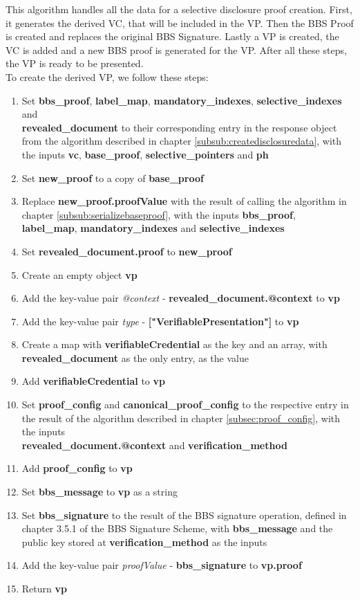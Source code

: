 \documentclass[
	a4paper               %
	,BCOR=0mm            %
	,bibliography=totoc   %
	,listof=totoc         %
	,monolingual
	,twoside=false
]{bfhthesis}              %
\begin{document}
This algorithm handles all the data for a selective disclosure proof creation.
First, it generates the derived VC, that will be included in the VP.
Then the BBS Proof is created and replaces the original BBS Signature.
Lastly a VP is created, the VC is added and a new BBS proof is generated for the VP.
After all these steps, the VP is ready to be presented.\\

To create the derived VP, we follow these steps:
\begin{enumerate}
	\item Set \textbf{bbs\_proof}, \textbf{label\_map}, \textbf{mandatory\_indexes}, \textbf{selective\_indexes} and \\\textbf{revealed\_document} to their corresponding entry in the response object from the algorithm described in chapter \ref{subsub:createdisclosuredata}, with the inputs \textbf{vc}, \textbf{base\_proof}, \textbf{selective\_pointers} and \textbf{ph}
	\item Set \textbf{new\_proof} to a copy of \textbf{base\_proof}
	\item Replace \textbf{new\_proof.proofValue} with the result of calling the algorithm in chapter \ref{subsub:serializebaseproof}, with the inputs \textbf{bbs\_proof}, \textbf{label\_map}, \textbf{mandatory\_indexes} and \textbf{selective\_indexes}
	\item Set \textbf{revealed\_document.proof} to \textbf{new\_proof}
	\item Create an empty object \textbf{vp}
	\item Add the key-value pair \textit{@context} - \textbf{revealed\_document.@context} to \textbf{vp}
	\item Add the key-value pair \textit{type} - \textbf{["VerifiablePresentation"]} to \textbf{vp}
	\item Create a map with \textbf{verifiableCredential} as the key and an array, with \\\textbf{revealed\_document} as the only entry, as the value
	\item Add \textbf{verifiableCredential} to \textbf{vp}
	\item Set \textbf{proof\_config} and \textbf{canonical\_proof\_config} to the respective entry in the result of the algorithm described in chapter \ref{subsec:proof_config}, with the inputs \\\textbf{revealed\_document.@context} and \textbf{verification\_method}
	\item Add \textbf{proof\_config} to \textbf{vp}
	\item Set \textbf{bbs\_message} to \textbf{vp} as a string
	\item Set \textbf{bbs\_signature} to the result of the BBS signature operation, defined in chapter 3.5.1 of the BBS Signature Scheme\cite{bbs-signature-scheme}, with \textbf{bbs\_message} and the public key stored at \textbf{verification\_method} as the inputs
	\item Add the key-value pair \textit{proofValue} - \textbf{bbs\_signature} to \textbf{vp.proof}
	\item Return \textbf{vp}
\end{enumerate}
\end{document}
